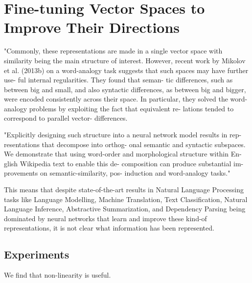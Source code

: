 \chapter{Fine-tuning Vector Spaces to Improve Their Directions}
"Commonly, these representations are made in a
single vector space with similarity being the main
structure of interest. However, recent work by Mikolov et al. (2013b) on a word-analogy task suggests that such spaces may have further use- ful internal regularities. They found that seman- tic differences, such as between big and small, and also syntactic differences, as between big and bigger, were encoded consistently across their space. In particular, they solved the word-analogy problems by exploiting the fact that equivalent re- lations tended to correspond to parallel vector- differences. \cite{Mitchell2015}

\cite{Mitchell2015} "Explicitly designing such structure into a neural network model results in rep- resentations that decompose into orthog- onal semantic and syntactic subspaces. We demonstrate that using word-order and morphological structure within En- glish Wikipedia text to enable this de- composition can produce substantial im- provements on semantic-similarity, pos- induction and word-analogy tasks."

 This means that despite state-of-the-art results in Natural Language Processing tasks like Language Modelling, Machine Translation, Text Classification, Natural Language Inference, Abstractive Summarization, and Dependency Parsing being dominated by neural networks that learn and improve these kind-of representations, it is not clear what information has been represented. 

\section{Experiments}
We find that non-linearity is useful.